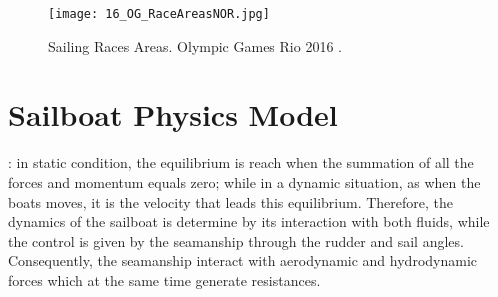 \begin{figure}[ht]
\centering
 \texttt{[image: 16\_OG\_RaceAreasNOR.jpg]}
  \caption{Sailing Races Areas. Olympic Games Rio 2016 \cite{instr_rio}.}
\label{fig:olymp_areas_rio} 
\end{figure}

\section {Sailboat Physics Model} \label{sailphysics}

:  in static condition, the equilibrium is reach when the summation of all the forces and momentum equals zero; while in a dynamic situation, as when the boats moves, it is the velocity that leads this equilibrium.
Therefore, the dynamics of the sailboat is determine by its interaction with both fluids, while the control is given by the seamanship through the rudder and sail angles. Consequently, the seamanship interact with aerodynamic and hydrodynamic forces which at the same time generate resistances.

